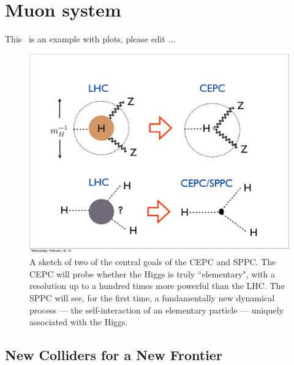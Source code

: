 \chapter{Muon system}
\label{Chapter:Muon}




This~\cite{cepc_website} is an example with plots, please edit ... 
%
\begin{figure}[h!]
\centering
\includegraphics[scale=0.36]{Figures/Muon/main_theme}
\caption{A sketch of two of the central goals of the CEPC and SPPC. The CEPC will probe whether the Higgs is truly ``elementary", with a resolution up to a hundred times more powerful than the LHC. The SPPC will see, for the first time, a fundamentally new dynamical process --- the self-interaction of an elementary particle --- uniquely associated with the Higgs.}
\label{fig:main_theme}
\end{figure}
%
\section{New Colliders for a New Frontier}


